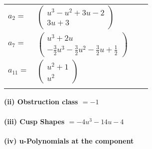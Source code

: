 \documentclass[1p]{elsarticle_modified}
\theoremstyle{definition}
\begin{document}
\begin{tabular}{m{7pt} m{180pt} m{7pt} m{180pt} }
\flushright $a_{2}=$&$\begin{pmatrix}u^3- u^2+3 u-2\\3 u+3\end{pmatrix}$ \\
\flushright $a_{7}=$&$\begin{pmatrix}u^3+2 u\\-\frac{3}{2} u^3-\frac{3}{2} u^2-\frac{3}{2} u+\frac{1}{2}\end{pmatrix}$ \\
\flushright $a_{11}=$&$\begin{pmatrix}u^2+1\\u^2\end{pmatrix}$\\&\end{tabular}
\flushleft \textbf{(ii) Obstruction class $= -1$}\\~\\
\flushleft \textbf{(iii) Cusp Shapes $= -4 u^3-14 u-4$}\\~\\
\newpage\renewcommand{\arraystretch}{1}
\flushleft \textbf{(iv) u-Polynomials at the component}\newline \\
\end{document}
